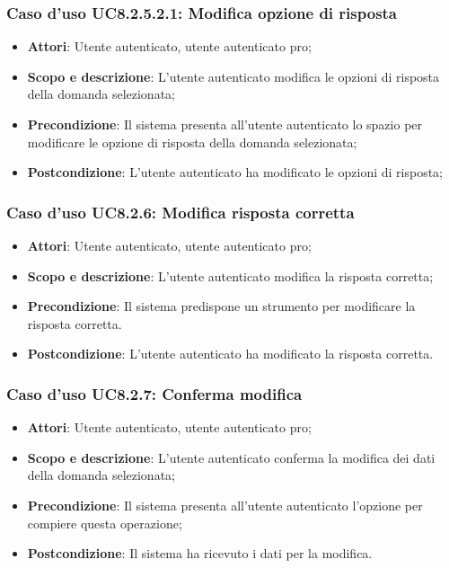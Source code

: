 		\subsubsection{Caso d'uso UC8.2.5.2.1: Modifica opzione di risposta}
		\begin{itemize}
		\item
			\textbf{Attori}: Utente autenticato, utente autenticato pro;
		\item
			\textbf{Scopo e descrizione}: L'utente autenticato modifica le opzioni di risposta della domanda selezionata;
		\item		
			\textbf{Precondizione}: Il sistema presenta all'utente autenticato lo spazio per modificare le opzione di risposta della domanda selezionata;
		\item		
			\textbf{Postcondizione}: L'utente autenticato ha modificato le opzioni di  risposta;
		\end{itemize}
	\subsubsection{Caso d'uso UC8.2.6: Modifica risposta corretta}
		\begin{itemize}
		\item
			\textbf{Attori}: Utente autenticato, utente autenticato pro;
		\item
			\textbf{Scopo e descrizione}: L'utente autenticato modifica la risposta corretta;
		\item		
			\textbf{Precondizione}: Il sistema predispone un strumento per modificare la risposta corretta.
		\item		
			\textbf{Postcondizione}: L'utente autenticato ha modificato la risposta corretta.
		\end{itemize}
	\subsubsection{Caso d'uso UC8.2.7: Conferma modifica}
	\begin{itemize}
		\item
			\textbf{Attori}: Utente autenticato, utente autenticato pro;
		\item
			\textbf{Scopo e descrizione}: L'utente autenticato conferma la modifica dei dati della domanda selezionata;
		\item		
			\textbf{Precondizione}: Il sistema presenta all'utente autenticato l'opzione per compiere questa operazione;
		\item
			\textbf{Postcondizione}: Il sistema ha ricevuto i dati per la modifica.
	\end{itemize}		
